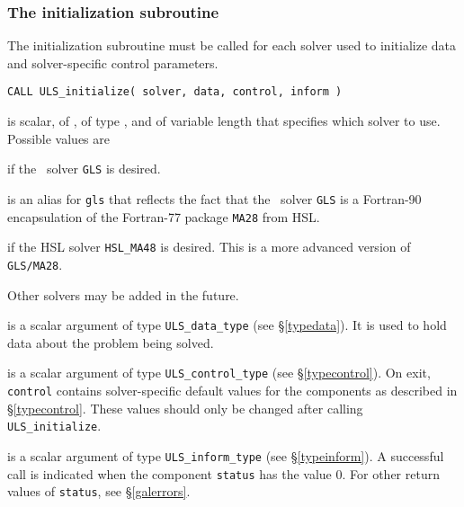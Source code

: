 \documentclass{galahad}
\newcommand{\packagename}{ULS}
\begin{document}

\galarguments


\subsubsection{The initialization subroutine}\label{subinit}
The initialization subroutine must be called for each solver used
to initialize data and solver-specific control parameters.

\hskip0.5in
{\tt CALL \packagename\_initialize( solver, data, control, inform )}
\begin{description}

 is scalar, of \intentin, of type \character, and of variable
length that specifies which solver to use. Possible values are
\begin{description}
 if the \galahad\ solver {\tt GLS} is desired.

 is an alias for {\tt gls} that reflects the fact that the \galahad\
 solver {\tt GLS} is a Fortran-90 encapsulation of the Fortran-77
 package {\tt MA28} from HSL.

 if the HSL solver {\tt HSL\_MA48} is desired. This is a more
advanced version of {\tt GLS/MA28}.




\end{description}
Other solvers may be added in the future.

 is a scalar \intentout argument of type
{\tt \packagename\_data\_type}
(see \S\ref{typedata}). It is used to hold data about the problem being
solved.

 is a scalar \intentout argument of type
{\tt \packagename\_control\_type}
(see \S\ref{typecontrol}).
On exit, {\tt control} contains solver-specific default values for the
components as described in \S\ref{typecontrol}.
These values should only be changed after calling
{\tt \packagename\_initialize}.

 is a scalar \intentout argument of type
{\tt \packagename\_inform\_type}
(see \S\ref{typeinform}).
A successful call is indicated when the  component {\tt status} has the value 0.
For other return values of {\tt status}, see \S\ref{galerrors}.

\end{description}
\end{document}
